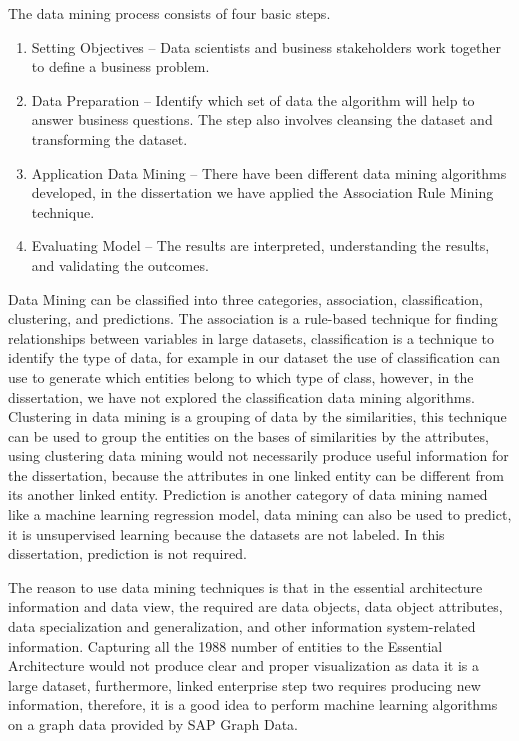 \documentclass{article}
\begin{document}
The data mining process consists of four basic steps. 
\begin{enumerate}
    \item Setting Objectives – Data scientists and business stakeholders work together to define a business problem.
    \item Data Preparation – Identify which set of data the algorithm will help to answer business questions. The step also involves cleansing the dataset and transforming the dataset.
    \item Application Data Mining – There have been different data mining algorithms developed, in the dissertation we have applied the Association Rule Mining technique.
    \item Evaluating Model – The results are interpreted, understanding the results, and validating the outcomes.
\end{enumerate}

Data Mining can be classified into three categories, association, classification, clustering, and predictions. The association is a rule-based technique for finding relationships between variables in large datasets, classification is a technique to identify the type of data, for example in our dataset the use of classification can use to generate which entities belong to which type of class, however, in the dissertation, we have not explored the classification data mining algorithms. Clustering in data mining is a grouping of data by the similarities, this technique can be used to group the entities on the bases of similarities by the attributes, using clustering data mining would not necessarily produce useful information for the dissertation, because the attributes in one linked entity can be different from its another linked entity. Prediction is another category of data mining named like a machine learning regression model, data mining can also be used to predict, it is unsupervised learning because the datasets are not labeled. In this dissertation, prediction is not required. \parencite{madni2017}

The reason to use data mining techniques is that in the essential architecture information and data view, the required are data objects, data object attributes, data specialization and generalization, and other information system-related information. Capturing all the 1988 number of entities to the Essential Architecture would not produce clear and proper visualization as data it is a large dataset, furthermore, linked enterprise step two requires producing new information, therefore, it is a good idea to perform machine learning algorithms on a graph data provided by SAP Graph Data.
\end{document}
